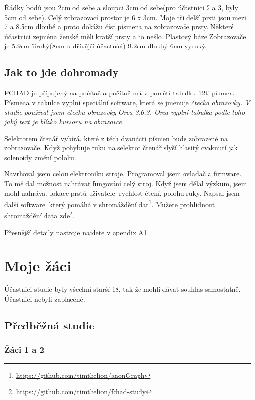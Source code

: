 Řádky bodů jsou 2cm od sebe a sloupci 3cm od sebe(pro účastnici 2 a 3, byly 5cm od sebe).  Celý zobrazovací prostor je 6 x 3cm.  Moje tři delší prsti jsou mezi 7 a 8.5cm dlouhé a proto dokážu číst písmena na zobrazovače prsty.  Některé účastnici zejména ženské měli kratší prsty a to nešlo.  Plastový báze Zobrazovače je 5.9cm široký(8cm u dřívější účastníci) 9.2cm dlouhý 6cm vysoký.

\subsection{Jak to jde dohromady}

FCHAD je přípojený na počítač a počítač má v pamětí tabulku 12ti písmen.  Písmena v tabulce vyplní speciální software, která se jmenuje \em čtečka obrazovky\em .  V studie používal jsem čtečku obrazovky Orca 3.6.3. Orca vyplní tabulku podle toho jaký text je blízko kursoru na obrazovce.

Selektorem čtenář vybírá, které z těch dvanácti písmen bude zobrazené na zobrazovače. Když pohybuje ruku na selektor čtenář slyší hlasitý cvaknutí jak solenoidy změní polohu.

Navrhoval jsem celou elektroniku stroje. Programoval jsem ovladač a firmware.  To mě dal možnost nahrávat fungování celý stroj.  Když jsem dělal výzkum, jsem mohl nahrávat lokace prstů uživatele, rychlost čtení, polohu ruky.  Napsal jsem další software, který pomáhá v shromáždění dat\footnote{\url{https://github.com/timthelion/anonGraph}}.  Mužete prohlidnout shromaždění data zde\footnote{\url{https://github.com/timthelion/fchad-study}}.

Přesnější detaily nastroje najdete v apendix A1.

\section{Moje žáci}

Účastnici studie byly všechní starší 18, tak že mohli dávat souhlas samostatně.  Účastnici nebyli zaplacené.

\subsection{Předběžná studie}

\subsubsection{Žáci 1 a 2}


